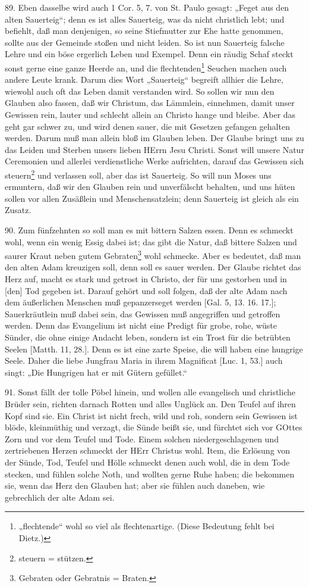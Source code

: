 89. Eben dasselbe wird auch 1 Cor. 5, 7. von St. Paulo gesagt: „Feget aus den alten Sauerteig“; denn es ist alles Sauerteig, was da nicht christlich lebt; und befiehlt, daß man denjenigen, so seine Stiefmutter zur Ehe hatte genommen, sollte aus der Gemeinde stoßen und nicht leiden. So ist nun Sauerteig falsche Lehre und ein böse ergerlich Leben und Exempel. Denn ein räudig Schaf steckt sonst gerne eine ganze Heerde an, und die flechtenden\footnote{„flechtende“ wohl so viel als flechtenartige. (Diese Bedeutung fehlt bei Dietz.)} Seuchen machen auch andere Leute krank. Darum dies Wort „Sauerteig“ begreift allhier die Lehre, wiewohl auch oft das Leben damit verstanden wird. So sollen wir nun den Glauben also fassen, daß
wir Christum, das Lämmlein, einnehmen, damit unser Gewissen rein, lauter und schlecht allein an Christo hange und bleibe. Aber das geht gar schwer zu, und wird denen sauer, die mit Gesetzen gefangen gehalten werden. Darum muß man allein bloß im Glauben leben. Der Glaube bringt uns zu das Leiden und Sterben unsers lieben HErrn Jesu Christi. Sonst will unsere Natur Ceremonien und allerlei verdienstliche Werke aufrichten, darauf das Gewissen sich steuern\footnote{steuern = stützen.} und verlassen soll, aber das ist Sauerteig. So will nun Moses uns ermuntern, daß wir den Glauben rein und unverfälscht behalten, und uns hüten sollen vor allen Zusäßlein und Menschensatzlein; denn Sauerteig ist gleich als ein Zusatz.

90. Zum fünfzehnten so soll man es mit bittern Salzen essen. Denn es schmeckt wohl, wenn ein wenig Essig dabei ist; das gibt die Natur, daß bittere Salzen und saurer Kraut neben gutem Gebraten\footnote{Gebraten oder Gebratnis = Braten.} wohl schmecke. Aber es bedeutet, daß man den alten Adam kreuzigen soll, denn soll es sauer werden. Der Glaube richtet das Herz auf, macht es stark und getrost in Christo, der für uns gestorben und in [den] Tod gegeben ist. Darauf gehört und soll folgen, daß der alte Adam nach dem äußerlichen Menschen muß gepanzerseget werden [Gal. 5, 13. 16. 17.]; Sauerkräutlein muß dabei sein, das Gewissen muß angegriffen und getroffen werden. Denn das Evangelium ist nicht eine Predigt für grobe, rohe, wüste Sünder, die ohne einige Andacht leben, sondern ist ein Trost für die betrübten Seelen [Matth. 11, 28.]. Denn es ist eine zarte Speise, die will haben eine hungrige Seele. Daher die liebe Jungfrau Maria in ihrem Magnificat [Luc. 1, 53.] auch singt: „Die Hungrigen hat er mit Gütern gefüllet.“

91. Sonst fällt der tolle Pöbel hinein, und wollen alle evangelisch und christliche Brüder sein, richten darnach Rotten und alles Unglück an. Den Teufel auf ihren Kopf sind sie. Ein Christ ist nicht frech, wild und roh, sondern sein Gewissen ist blöde, kleinmüthig und verzagt, die Sünde beißt sie, und fürchtet sich vor GOttes Zorn und vor dem Teufel und Tode. Einem solchen niedergeschlagenen und zertriebenen Herzen schmeckt der HErr Christus wohl. Item, die Erlösung von der Sünde, Tod, Teufel und Hölle schmeckt denen auch wohl, die in dem Tode stecken, und fühlen solche Noth, und wollten gerne Ruhe haben; die bekommen sie, wenn das Herz den Glauben hat; aber sie fühlen auch daneben, wie gebrechlich der alte Adam sei.

